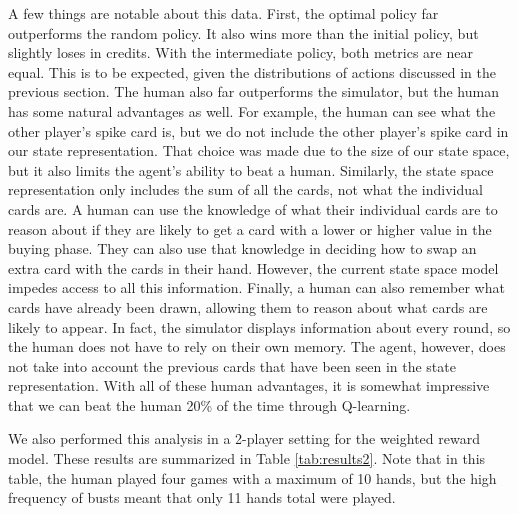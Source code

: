 \documentclass{article}
\begin{document}
A few things are notable about this data. First, the optimal policy far outperforms the random policy. It also wins more than the initial policy, but slightly loses in credits. With the intermediate policy, both metrics are near equal. This is to be expected, given the distributions of actions discussed in the previous section. The human also far outperforms the simulator, but the human has some natural advantages as well. For example, the human can see what the other player's spike card is, but we do not include the other player's spike card in our state representation. That choice was made due to the size of our state space, but it also limits the agent's ability to beat a human. Similarly, the state space representation only includes the sum of all the cards, not what the individual cards are. A human can use the knowledge of what their individual cards are to reason about if they are likely to get a card with a lower or higher value in the buying phase. They can also use that knowledge in deciding how to swap an extra card with the cards in their hand. However, the current state space model impedes access to all this information. Finally, a human can also remember what cards have already been drawn, allowing them to reason about what cards are likely to appear. In fact, the simulator displays information about every round, so the human does not have to rely on their own memory. The agent, however, does not take into account the previous cards that have been seen in the state representation. With all of these human advantages, it is somewhat impressive that we can beat the human 20\% of the time through Q-learning.

We also performed this analysis in a 2-player setting for the weighted reward model. These results are summarized in Table \ref{tab:results2}. Note that in this table, the human played four games with a maximum of 10 hands, but the high frequency of busts meant that only 11 hands total were played.
\end{document}
